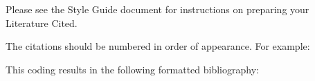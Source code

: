 \documentclass[letterpaper]{ar-1col}
\begin{document}
\noindent
Please see the Style Guide document for instructions on preparing your Literature Cited.

The citations should be numbered in order of appearance. For example:



% 
% 
% 
% 
% 
% 
% 
% 
% 
% 
% 
% 

This coding results in the following formatted bibliography:
\end{document}

